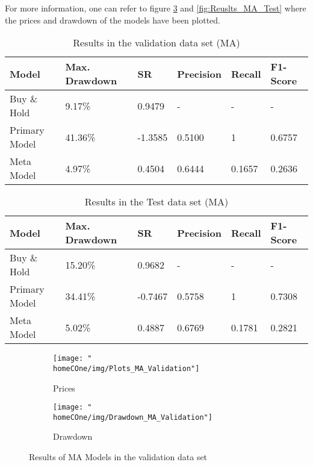 \documentclass[a4paper]{report}
\newcommand{\homeCOne}{../../Chapter 1 - Metalabeling/Draft}
\begin{document}
For more information, one can refer to figure \ref{fig:Results_MA_Validation} 
and \ref{fig:Reuslts_MA_Test} where the prices and drawdown of the models 
have been plotted.

\begin{table}[htbp]
\caption{Results in the validation data set (MA)}
\label{tab:ResultsCV}
\centering
\begin{tabular}{ |C{3cm}|C{3cm}|C{2cm}|C{2cm}|C{2cm}|C{2cm}|}
	\hline
	Model 			& Max. Drawdown	& SR			& Precision & Recall 
	& F1-Score\\
	\hline
	Buy \& Hold		&  9.17\% 		&  0.9479	& -		 & - 
	& -\\  
	Primary Model 	& 41.36\% 		& -1.3585	& 0.5100 & 1 
	& 0.6757\\ 
	Meta Model 		&  4.97\% 		&  0.4504	& 0.6444 & 0.1657
	& 0.2636\\ 
	\hline
\end{tabular}
\end{table}

\begin{table}[htbp]
\caption{Results in the Test data set (MA)}
\label{tab:ResultsTst}
\centering
\begin{tabular}{ |C{3cm}|C{3cm}|C{2cm}|C{2cm}|C{2cm}|C{2cm}|}
	\hline
	Model 			& Max. Drawdown & SR			& Precision & Recall
	& F1-Score\\
	\hline
	Buy \& Hold		& 15.20\% 		&  0.9682	& - 		 & - 
	& -\\ 
	Primary Model 	& 34.41\% 		& -0.7467	& 0.5758 & 1 
	& 0.7308\\ 
	Meta Model 		&  5.02\% 		&  0.4887	& 0.6769 & 0.1781
	& 0.2821\\ 
	\hline
\end{tabular}
\end{table}

\begin{figure}[htbp]
	\centering
	\begin{subfigure}{.5\textwidth}
		\centering
		\texttt{[image: "\\homeCOne/img/Plots\_MA\_Validation"]}
		\caption{Prices}
		\label{fig:Plots_MA_Validation}
	\end{subfigure}%
	\begin{subfigure}{.5\textwidth}
		\centering
		\texttt{[image: "\\homeCOne/img/Drawdown\_MA\_Validation"]}
		\caption{Drawdown}
		\label{fig:Drawdown_MA_Validation}	
	\end{subfigure}
	\caption{Results of MA Models in the validation data set}
	\label{fig:Results_MA_Validation}
\end{figure}
\end{document}
